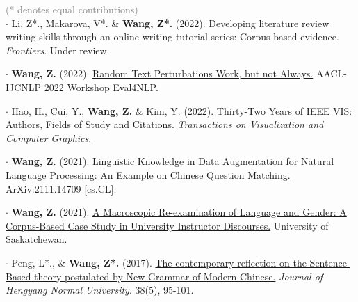 \documentclass[letterpaper,11pt]{article}
\newcommand{\resumeSubHeadingListStart}{\begin{itemize}[leftmargin=0.15in, label={}]}
\newcommand{\resumeSubHeadingListEnd}{\end{itemize}}
\begin{document}
  \resumeSubHeadingListStart
    \small{\item{
    \textcolor{gray}{(* denotes equal contributions)} \\ \vspace{2pt}
        $\cdot$ Li, Z*., Makarova, V*. \& \textbf{Wang, Z*.} (2022). Developing literature review writing skills through an online writing tutorial series: Corpus-based evidence. \emph{Frontiers}. Under review. \\ \vspace{2pt}
        
        $\cdot$ \textbf{Wang, Z.} (2022). \href{https://arxiv.org/abs/2209.00797}{Random Text Perturbations Work, but not Always.} AACL-IJCNLP 2022 Workshop Eval4NLP. \\ \vspace{2pt}
        
        $\cdot$ Hao, H., Cui, Y., \textbf{Wang, Z.} \& Kim, Y. (2022). \href{https://arxiv.org/abs/2208.03772}{Thirty-Two Years of IEEE VIS: Authors, Fields of Study and Citations.} \emph{Transactions on Visualization and Computer Graphics}. \\ \vspace{2pt}
        
        $\cdot$ \textbf{Wang, Z.} (2021). \href{https://arxiv.org/abs/2111.14709}{Linguistic Knowledge in Data Augmentation for Natural Language Processing: An Example on Chinese Question Matching.} ArXiv:2111.14709 [cs.CL]. \\ \vspace{2pt}
        
        $\cdot$ \textbf{Wang, Z.} (2021). \href{https://harvest.usask.ca/handle/10388/13387}{A Macroscopic Re-examination of Language and Gender: A Corpus-Based Case Study in University Instructor Discourses.} University of Saskatchewan. \\ \vspace{2pt}
        
        $\cdot$ Peng, L*., \& \textbf{Wang, Z*.} (2017). \href{https://www.researchgate.net/publication/340730935_The_contemporary_reflection_on_the_Sentence-Based_theory_postulated_by_New_Grammar_of_Modern_Chinese}{The contemporary reflection on the Sentence-Based theory postulated by New Grammar of Modern Chinese.} \emph{Journal of Hengyang Normal University}. 38(5), 95-101.
    }} \\ \vspace{-5pt}
  \resumeSubHeadingListEnd
  
\end{document}
